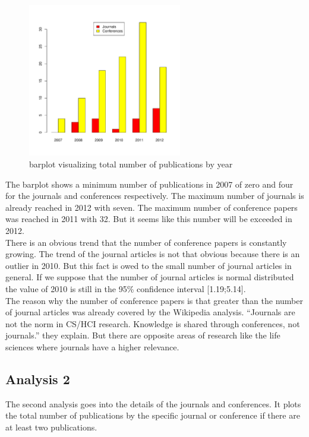 \documentclass[english]{lni}
\begin{document}
\begin{figure}[htb]
\centering
\includegraphics[width=0.6\textwidth]{auswertung1.pdf}
\caption{\label{fig:auswertung1}barplot visualizing total number of publications by year}
\end{figure}

   The barplot shows a minimum number of publications in 2007 of zero and four
   for the journals and conferences respectively. The maximum number of journals
   is already reached in 2012 with seven. The maximum number of conference
   papers was reached in 2011 with 32. But it seems like this number will be
   exceeded in 2012.\\ There is an obvious trend that the number of conference
   papers is constantly growing. The trend of the journal articles is not that
   obvious because there is an outlier in 2010. But this fact is owed to the
   small number of journal articles in general. If we suppose that the number of
   journal articles is normal distributed the value of 2010 is still in the 95\%
   confidence interval [1.19;5.14].\\ The reason why the number of conference
   papers is that greater than the number of journal articles was already
   covered by the Wikipedia analysis. ``Journals are not the norm in
   CS/HCI research. Knowledge is shared through conferences, not journals.''
   \cite{wiki} they explain. But there are opposite areas of research like the life sciences where
   journals have a higher relevance.
\subsection{Analysis 2}
\label{sec-3-2}

   The second analysis goes into the details of the journals and conferences. It
   plots the total number of publications by the specific journal or conference
   if there are at least two publications.
   
\end{document}
